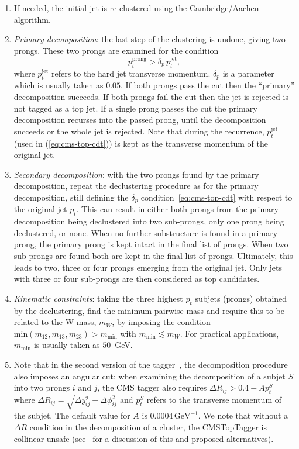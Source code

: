 \begin{enumerate}
\item If needed, the initial jet is re-clustered using the Cambridge/Aachen
  algorithm.
%
\item {\em Primary decomposition}: the last step of the clustering is
  undone, giving two prongs. These two prongs are examined for the
  condition
  \begin{equation}\label{eq:cms-top-cdt}
    p_t^{\mathrm{prong}} > \delta_p \, p_t^{\text{jet}},
  \end{equation}
  where $p_t^{\text{jet}}$ refers to the hard jet transverse
  momentum. $\delta_p$ is a parameter which is usually taken as
  $0.05$.
  If both prongs pass the cut then the ``primary'' decomposition
  succeeds.
  If both prongs fail the cut then the jet is rejected \ie is not
  tagged as a top jet.
  If a single prong passes the cut the primary decomposition recurses
  into the passed prong, until the decomposition succeeds or the whole
  jet is rejected.
  Note that during the recurrence, $p_t^{\text{jet}}$ (used in
  (\ref{eq:cms-top-cdt})) is kept as the transverse momentum of the
  original jet.
\item {\em Secondary decomposition}: with the two prongs found by the
  primary decomposition, repeat the declustering procedure as for
  the primary decomposition, still defining the $\delta_p$
  condition~\eqref{eq:cms-top-cdt} with respect to the original jet $p_t$.
  This can result in either both prongs from the primary decomposition
  being declustered into two sub-prongs, only one prong being
  declustered, or none.
  When no further substructure is found in a primary prong, the
  primary prong is kept intact in the final list of prongs. When two
  sub-prongs are found both are kept in the final list of prongs.
  Ultimately, this leads to two, three or four prongs emerging from
  the original jet. Only jets with three or four sub-prongs are then
  considered as top candidates.
\item {\em Kinematic constraints}: taking the three highest $p_t$
  subjets (\ie prongs) obtained by the declustering, find the minimum
  pairwise mass and require this to be related to the W mass, $m_W$,
  by imposing the condition
  $\mathrm{min} \left(m_{12},m_{13},m_{23} \right) > m_{\mathrm{min}}
  $ with $m_{\mathrm{min}} \lesssim m_W$.
  For practical applications, $m_{\text{min}}$ is usually taken as
  $50$~GeV.
\item Note that in the second version of the
  tagger~\cite{CMS:2014fya}, the decomposition procedure also imposes
  an angular cut: when examining the decomposition of a subjet $S$
  into two prongs $i$ and $j$, the CMS tagger also requires
  $\Delta R_{ij} > 0.4 - A p_t^S$ where
  $\Delta R_{ij} = \sqrt{\Delta y_{ij}^2+ \Delta \phi_{ij}^2}$ and
  $p_t^S$ refers to the transverse momentum of the
  subjet.
  The default value for $A$ is $0.0004 \, \mathrm{GeV^{-1}}$.
  We note that without a $\Delta R$ condition in the decomposition of
  a cluster, the CMSTopTagger is collinear unsafe
  (see~\cite{Dasgupta:2018emf} for a discussion of this and proposed
  alternatives).
\end{enumerate}




